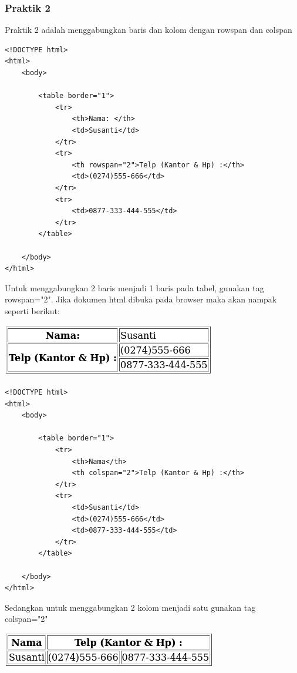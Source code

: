 \documentclass[a4paper,12pt]{article}
\begin{document}
\subsubsection{Praktik 2}
Praktik 2 adalah menggabungkan baris dan kolom dengan rowspan dan colspan
\begin{lstlisting}[style=htmlcssjs]
<!DOCTYPE html>
<html>
    <body>

        <table border="1">
            <tr>
                <th>Nama: </th>
                <td>Susanti</td>
            </tr>
            <tr>
                <th rowspan="2">Telp (Kantor & Hp) :</th>
                <td>(0274)555-666</td>
            </tr>
            <tr>
                <td>0877-333-444-555</td>
            </tr>
        </table>

    </body>
</html>
\end{lstlisting}
Untuk menggabungkan 2 baris menjadi 1 baris pada tabel, gunakan tag rowspan="2". Jika dokumen html dibuka pada browser
maka akan nampak seperti berikut:
\begin{center}
    \includegraphics[scale=.7]{2.png} 
\end{center}

\begin{lstlisting}[style=htmlcssjs]
<!DOCTYPE html>
<html>
    <body>
        
        <table border="1">
            <tr>
                <th>Nama</th>
                <th colspan="2">Telp (Kantor & Hp) :</th>
            </tr>
            <tr>
                <td>Susanti</td>
                <td>(0274)555-666</td>
                <td>0877-333-444-555</td>
            </tr>
        </table>

    </body>
</html>
\end{lstlisting}

Sedangkan untuk menggabungkan 2 kolom menjadi satu gunakan tag colspan="2"

\begin{center}
    \includegraphics[scale=.7]{3.png} 
\end{center}
\end{document}
